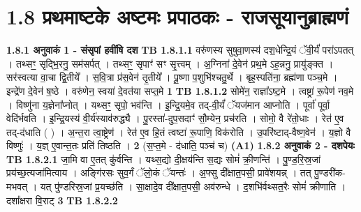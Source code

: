 \documentclass[17pt]{extarticle}
\begin{document}
     \section*{ 1.8     प्रथमाष्टके अष्टमः प्रपाठकः - राजसूयानुब्राह्मणं }
                \textbf{ 1.8.1     अनुवाकं   1 - संसृपां हवींषि दश} \newline
                                \textbf{ TB 1.8.1.1} \newline
                  वरु॑णस्य सुषुवा॒णस्य॑ दश॒धेन्द्रि॒यं ॅवी॒र्यं॑ परा॑ऽपतत् । तथ्सꣳ॒॒ सृद्भि॒रनु॒ सम॑सर्पत् । तथ्सꣳ॒॒ सृपाꣳ॑ सꣳ सृ॒त्त्वम् । अ॒ग्निना॑ दे॒वेन॑ प्रथ॒मे ऽह॒न्ननु॒ प्रायु॑ङ्क्त । सर॑स्वत्या वा॒चा द्वि॒तीये᳚ । स॒वि॒त्रा प्र॑स॒वेन॑ तृ॒तीये᳚ । पू॒ष्णा प॒शुभि॑श्चतु॒र्थे । बृह॒स्पति॑ना॒ ब्रह्म॑णा पञ्च॒मे । इन्द्रे॑ण दे॒वेन॑ ष॒ष्ठे । वरु॑णेन॒ स्वया॑ दे॒वत॑या सप्त॒मे \textbf{ 1} \newline
                  \newline
                                \textbf{ TB 1.8.1.2} \newline
                  सोमे॑न॒ राज्ञा᳚ऽष्ट॒मे । त्वष्ट्रा॑ रू॒पेण॑ नव॒मे । विष्णु॑ना य॒ज्ञेना᳚प्नोत् । यथ्सꣳ॒॒ सृपो॒ भव॑न्ति । इ॒न्द्रि॒यमे॒व तद्-वी॒र्यं॑ ॅयज॑मान आप्नोति । पूर्वा॑ पूर्वा॒ वेदि॑र्भवति । इ॒न्द्रि॒यस्य॑ वी॒र्य॑स्याव॑रुद्ध्यै । पु॒रस्ता॑-दुप॒सदाꣳ॑ सौ॒म्येन॒ प्रच॑रति । सोमो॒ वै रे॑तो॒धाः । रेत॑ ए॒व तद्-द॑धाति ( ) । अ॒न्त॒रा त्वा॒ष्ट्रेण॑ । रेत॑ ए॒व हि॒तं त्वष्टा॑ रू॒पाणि॒ विक॑रोति । उ॒परि॑ष्टाद्-वैष्ण॒वेन॑ । य॒ज्ञो वै विष्णुः॑ । य॒ज्ञ् ए॒वान्त॒तः प्रति॑ तिष्ठति । \textbf{ 2} \newline
                  \newline
                                    (स॒प्त॒मे - द॑धाति॒ पञ्च॑ च) \textbf{(A1)} \newline \newline
                \textbf{ 1.8.2     अनुवाकं   2 - दशपेयः} \newline
                                \textbf{ TB 1.8.2.1} \newline
                  जा॒मि वा ए॒तत् कु॑र्वन्ति । यथ्स॒द्यो दी॒क्षय॑न्ति स॒द्यः सोमं॑ क्री॒णन्ति॑ । पु॒ण्ड॒रि॒स्र॒जां प्रय॑च्छ॒त्यजा॑मित्वाय । अङ्गि॑रसः सुव॒र्गं ॅलो॒कं ॅयन्तः॑ । अ॒फ्सु दी᳚क्षात॒पसी॒ प्रावे॑शयन्न् । तत् पु॒ण्डरी॑क-मभवत् । यत् पु॑ण्डरिस्र॒जां प्र॒यच्छ॑ति । सा॒क्षादे॒व दी᳚क्षात॒पसी॒ अव॑रुन्धे । द॒शभि॑र्वथ्सत॒रैः सोमं॑ क्रीणाति । दशा᳚क्षरा वि॒राट् \textbf{ 3} \newline
                  \newline
                                \textbf{ TB 1.8.2.2} \newline
\end{document}
